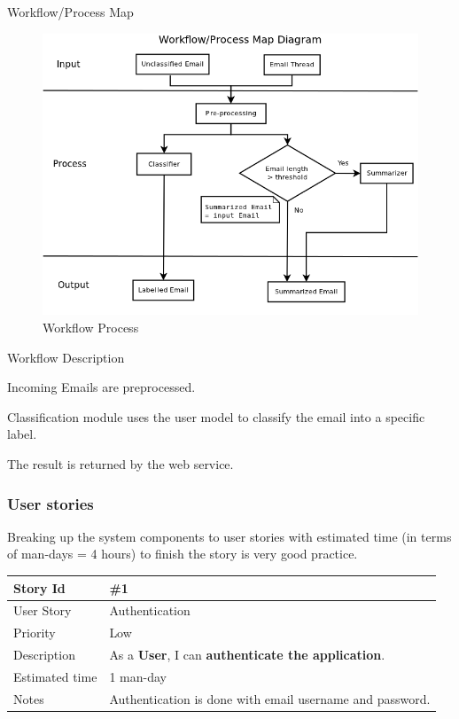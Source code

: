 \begin{my_enumerate}
  \item Workflow/Process Map 
	
\begin{figure}[H]
  \centering
\includegraphics[width=13cm]{workflow_process_map.png}
  \caption[Workflow Process] {Workflow Process}
\end{figure}

  \item Workflow Description
  \begin{my_itemize}
    \item Incoming Emails are preprocessed.
    \item Classification module uses the user model to classify the email into a specific label.
    \item The result is returned by the web service.
  \end{my_itemize}
\end{my_enumerate}

\subsubsection{User stories}
Breaking up the system components to user stories with estimated time (in terms
of man-days = 4 hours) to finish the story is very good practice.
\\

\begin{tabular}{|p{3cm}|p{10cm}|}
\hline
\cellcolor[gray]{0.9} Story Id & \#1 \\ \hline
\cellcolor[gray]{0.9} User Story & Authentication \\ \hline
\cellcolor[gray]{0.9} Priority & Low \\ \hline
\cellcolor[gray]{0.9} Description & 
      As a \textbf{User}, I can \textbf{authenticate the application}. \\ \hline
\cellcolor[gray]{0.9} Estimated time & 1 man-day \\ \hline
\cellcolor[gray]{0.9} Notes & 
      Authentication is done with email username and password. \\ \hline
\end{tabular}

